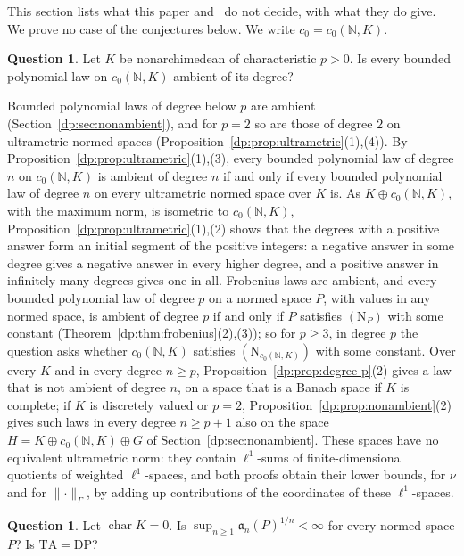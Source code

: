 \documentclass[11pt]{amsart}
\theoremstyle{definition}
\theoremstyle{remark}
\numberwithin{equation}{section}
\newcommand{\N}{\mathbb N}
\newcommand{\norm}[1]{\lVert #1\rVert}
\theoremstyle{plain}
\theoremstyle{definition}
\newtheorem{question}[theorem]{Question}
\theoremstyle{plain}
\begin{document}
This section lists what this paper and~\cite{I} do not decide, with what they do give. We prove no case of the conjectures below. We write $c_0=c_0(\N,K)$.

\begin{question}\label{q:quest:polynomial-laws}
Let $K$ be nonarchimedean of characteristic $p>0$. Is every bounded polynomial law on $c_0(\N,K)$ ambient of its degree?
\end{question}

Bounded polynomial laws of degree below $p$ are ambient (Section~\ref{dp:sec:nonambient}), and for $p=2$ so are those of degree $2$ on ultrametric normed spaces (Proposition~\ref{dp:prop:ultrametric}(1),(4)). By Proposition~\ref{dp:prop:ultrametric}(1),(3), every bounded polynomial law of degree $n$ on $c_0(\N,K)$ is ambient of degree $n$ if and only if every bounded polynomial law of degree $n$ on every ultrametric normed space over $K$ is. As $K\oplus c_0(\N,K)$, with the maximum norm, is isometric to $c_0(\N,K)$, Proposition~\ref{dp:prop:ultrametric}(1),(2) shows that the degrees with a positive answer form an initial segment of the positive integers: a negative answer in some degree gives a negative answer in every higher degree, and a positive answer in infinitely many degrees gives one in all. Frobenius laws are ambient, and every bounded polynomial law of degree $p$ on a normed space $P$, with values in any normed space, is ambient of degree $p$ if and only if $P$ satisfies $(\mathrm N_P)$ with some constant (Theorem~\ref{dp:thm:frobenius}(2),(3)); so for $p\ge3$, in degree $p$ the question asks whether $c_0(\N,K)$ satisfies $(\mathrm N_{c_0(\N,K)})$ with some constant. Over every $K$ and in every degree $n\ge p$, Proposition~\ref{dp:prop:degree-p}(2) gives a law that is not ambient of degree $n$, on a space that is a Banach space if $K$ is complete; if $K$ is discretely valued or $p=2$, Proposition~\ref{dp:prop:nonambient}(2) gives such laws in every degree $n\ge p+1$ also on the space $H=K\oplus c_0(\N,K)\oplus G$ of Section~\ref{dp:sec:nonambient}. These spaces have no equivalent ultrametric norm: they contain $\ell^1$-sums of finite-dimensional quotients of weighted $\ell^1$-spaces, and both proofs obtain their lower bounds, for $\nu$ and for $\norm\cdot_\Gamma$, by adding up contributions of the coordinates of these $\ell^1$-spaces.

\begin{question}\label{dp:q:char0}
Let $\operatorname{char}K=0$. Is $\sup_{n\ge1}\mathfrak a_n(P)^{1/n}<\infty$ for every normed space $P$? Is $\mathrm{TA}=\mathrm{DP}$?
\end{question}
\end{document}
